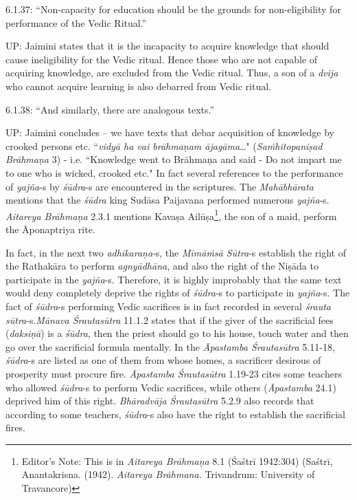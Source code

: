 6.1.37: “Non-capacity for education should be the grounds for non-eligibility for performance of the Vedic Ritual.”

\newpage

UP: Jaimini states that it is the incapacity to acquire knowledge that should cause ineligibility for the Vedic ritual. Hence those who are not capable of acquiring knowledge, are excluded from the Vedic ritual. Thus, a son of a \textit{dvija }who cannot acquire learning is also debarred from Vedic ritual.

6.1.38: “And similarly, there are analogous texts.”

UP: Jaimini concludes – we have texts that debar acquisition of knowledge by crooked persons etc. ``\textit{vidyā ha vai brāhmaṇam ājagāma}…" (\textit{Saṁhitopaniṣad Brāhmaṇa} 3) - i.e. ``Knowledge went to Brāhmaṇa and said - Do not impart me to one who is wicked, crooked etc." In fact several references to the performance of \textit{yajña}-s by \textit{śūdra}-s are encountered in the scriptures. The \textit{Mahābhārata} mentions that the \textit{śūdra} king Sudāsa Paijavana performed numerous \textit{yajña}-s. \textit{Aitareya Brāhmaṇa} 2.3.1 mentions Kavaṣa Ailūṣa\footnote{Editor's Note: This is in \textit{Aitareya Brāhmaṇa} 8.1 (Śaśtrī 1942:304) (Saśtrī, Anantakrisna. (1942). \textit{Aitareya Brāhmana.} Trivandrum: University of Travancore)}, the son of a maid, perform the Āponaptriya rite.

In fact, in the next two \textit{adhikaraṇa}-s, the \textit{Mīmāṁsā Sūtra}-s establish the right of the Rathakāra to perform \textit{agnyādhāna}, and also the right of the Niṣāda to participate in the \textit{yajña}-s. Therefore, it is highly improbably that the same text would deny completely deprive the rights of \textit{śūdra}-s to participate in \textit{yajña}-s. The fact of \textit{śūdra}-s performing Vedic sacrifices is in fact recorded in several \textit{śrauta sūtra}-s.\break \textit{Mānava Śrautasūtra} 11.1.2 states that if the giver of the sacrificial fees (\textit{daksiṇā}) is a \textit{śūdra}, then the priest should go to his house, touch water and then go over the sacrificial formula mentally. In the \textit{Āpastamba Śrautasūtra} 5.11-18, \textit{śūdra}-s are listed as one of them from whose homes, a sacrificer desirous of prosperity must procure fire. \textit{Āpastamba Śrautasūtra} 1.19-23 cites some teachers who allowed \textit{śūdra}-s to perform Vedic sacrifices, while others (\textit{Āpastamba} 24.1) deprived him of this right. \textit{Bhāradvāja Śrautasūtra} 5.2.9 also records that according to some teachers, \textit{śūdra}-s also have the right to establish the sacrificial fires.

